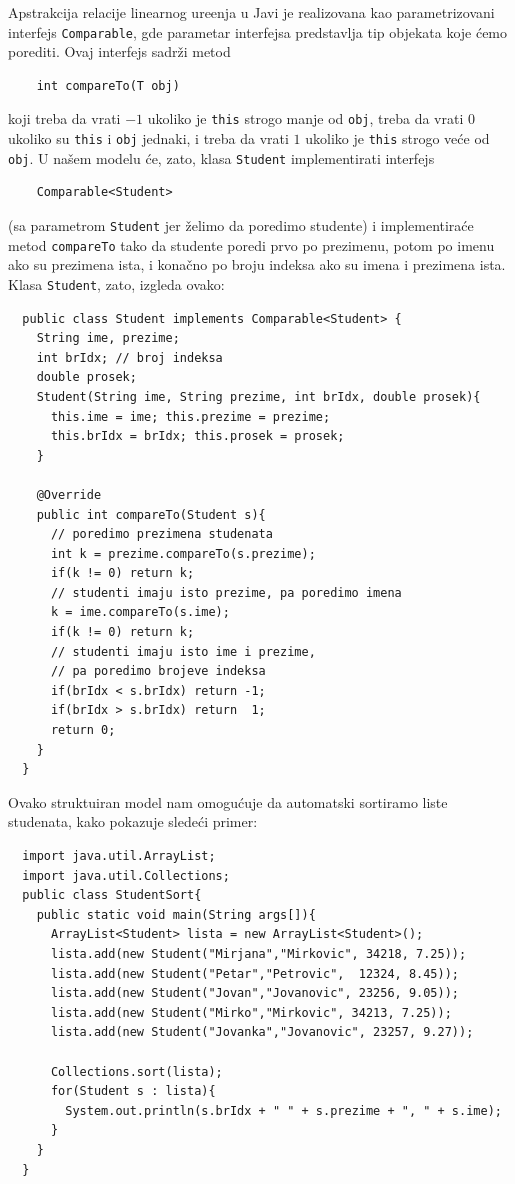Apstrakcija relacije linearnog ure\dj enja u Javi je realizovana kao parametrizovani interfejs \verb`Comparable`, gde
parametar interfejsa predstavlja tip objekata koje \'cemo porediti. Ovaj interfejs sadr\v zi metod
{\small
\begin{verbatim}
    int compareTo(T obj)
\end{verbatim}
}
\noindent
koji treba da vrati $-1$ ukoliko je \verb`this` strogo manje od \verb`obj`, treba da vrati $0$ ukoliko su \verb`this` i \verb`obj`
jednaki, i treba da vrati $1$ ukoliko je \verb`this` strogo ve\'ce od \verb`obj`. U na\v sem modelu \'ce, zato, klasa
\verb`Student` implementirati interfejs
{\small
\begin{verbatim}
    Comparable<Student>
\end{verbatim}
}
\noindent
(sa parametrom \verb`Student` jer \v zelimo
da poredimo studente) i implementira\'ce metod \verb`compareTo` tako da studente poredi prvo po prezimenu, potom
po imenu ako su prezimena ista, i kona\v cno po broju indeksa ako su imena i prezimena ista. Klasa \verb`Student`, zato,
izgleda ovako:
{\small
\begin{verbatim}
  public class Student implements Comparable<Student> {
    String ime, prezime;
    int brIdx; // broj indeksa
    double prosek;
    Student(String ime, String prezime, int brIdx, double prosek){
      this.ime = ime; this.prezime = prezime;
      this.brIdx = brIdx; this.prosek = prosek;
    }
    
    @Override
    public int compareTo(Student s){
      // poredimo prezimena studenata
      int k = prezime.compareTo(s.prezime);
      if(k != 0) return k;
      // studenti imaju isto prezime, pa poredimo imena
      k = ime.compareTo(s.ime);
      if(k != 0) return k;
      // studenti imaju isto ime i prezime,
      // pa poredimo brojeve indeksa
      if(brIdx < s.brIdx) return -1; 
      if(brIdx > s.brIdx) return  1;
      return 0;
    }
  }
\end{verbatim}
}

\noindent
Ovako struktuiran model nam omogu\'cuje da automatski sortiramo liste studenata, kako pokazuje slede\'ci primer:
{\small
\begin{verbatim}
  import java.util.ArrayList;
  import java.util.Collections;
  public class StudentSort{
    public static void main(String args[]){
      ArrayList<Student> lista = new ArrayList<Student>();
      lista.add(new Student("Mirjana","Mirkovic", 34218, 7.25));
      lista.add(new Student("Petar","Petrovic",  12324, 8.45));
      lista.add(new Student("Jovan","Jovanovic", 23256, 9.05));
      lista.add(new Student("Mirko","Mirkovic", 34213, 7.25));
      lista.add(new Student("Jovanka","Jovanovic", 23257, 9.27));
        
      Collections.sort(lista);
      for(Student s : lista){
        System.out.println(s.brIdx + " " + s.prezime + ", " + s.ime);
      }
    }
  }
\end{verbatim}
}





